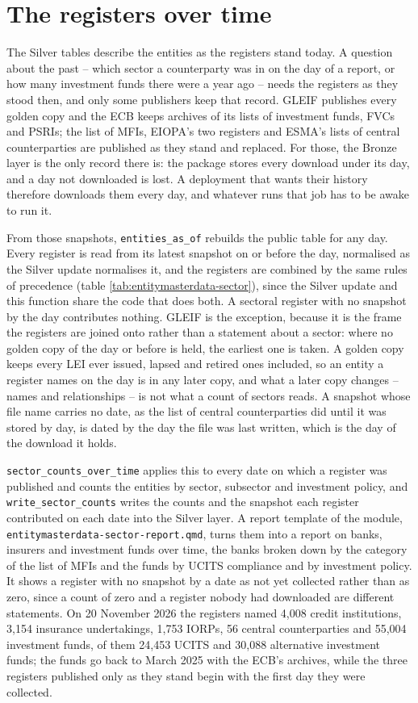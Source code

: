 \section{The registers over time}\label{sec:entitymasterdata-history}

The Silver tables describe the entities as the registers stand today. A question about the past -- which sector a counterparty was in on the day of a report, or how many investment funds there were a year ago -- needs the registers as they stood then, and only some publishers keep that record. GLEIF publishes every golden copy and the ECB keeps archives of its lists of investment funds, FVCs and PSRIs; the list of MFIs, EIOPA's two registers and ESMA's lists of central counterparties are published as they stand and replaced. For those, the Bronze layer is the only record there is: the package stores every download under its day, and a day not downloaded is lost. A deployment that wants their history therefore downloads them every day, and whatever runs that job has to be awake to run it.

From those snapshots, \verb|entities_as_of| rebuilds the public table for any day. Every register is read from its latest snapshot on or before the day, normalised as the Silver update normalises it, and the registers are combined by the same rules of precedence (table \ref{tab:entitymasterdata-sector}), since the Silver update and this function share the code that does both. A sectoral register with no snapshot by the day contributes nothing. GLEIF is the exception, because it is the frame the registers are joined onto rather than a statement about a sector: where no golden copy of the day or before is held, the earliest one is taken. A golden copy keeps every LEI ever issued, lapsed and retired ones included, so an entity a register names on the day is in any later copy, and what a later copy changes -- names and relationships -- is not what a count of sectors reads. A snapshot whose file name carries no date, as the list of central counterparties did until it was stored by day, is dated by the day the file was last written, which is the day of the download it holds.

\verb|sector_counts_over_time| applies this to every date on which a register was published and counts the entities by sector, subsector and investment policy, and \verb|write_sector_counts| writes the counts and the snapshot each register contributed on each date into the Silver layer. A report template of the module, \verb|entitymasterdata-sector-report.qmd|, turns them into a report on banks, insurers and investment funds over time, the banks broken down by the category of the list of MFIs and the funds by UCITS compliance and by investment policy. It shows a register with no snapshot by a date as not yet collected rather than as zero, since a count of zero and a register nobody had downloaded are different statements. On 20 November 2026 the registers named 4,008 credit institutions, 3,154 insurance undertakings, 1,753 IORPs, 56 central counterparties and 55,004 investment funds, of them 24,453 UCITS and 30,088 alternative investment funds; the funds go back to March 2025 with the ECB's archives, while the three registers published only as they stand begin with the first day they were collected.

